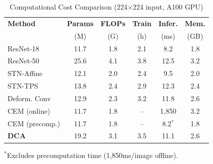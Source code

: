 \begin{table}[t]
\centering
\caption{Computational Cost Comparison (224$\times$224 input, A100 GPU)}
\label{tab:computational}
\begin{tabularx}{\textwidth}{Xccccc}
\hline
\textbf{Method} & \textbf{Params} & \textbf{FLOPs} & \textbf{Train} & \textbf{Infer.} & \textbf{Mem.} \\
 & (M) & (G) & (h) & (ms) & (GB) \\
\hline
ResNet-18 & 11.7 & 1.8 & 2.1 & 8.2 & 1.8 \\
ResNet-50 & 25.6 & 4.1 & 3.8 & 12.5 & 3.2 \\
STN-Affine & 12.1 & 2.0 & 2.4 & 9.5 & 2.0 \\
STN-TPS & 13.8 & 2.4 & 2.9 & 12.3 & 2.4 \\
Deform. Conv & 12.9 & 2.3 & 3.2 & 11.8 & 2.6 \\
CEM (online) & 11.7 & 1.8 & -- & 1,850 & 3.2 \\
CEM (precomp.) & 11.7 & 1.8 & -- & 8.2$^*$ & 1.8 \\
\textbf{DCA} & 19.2 & 3.1 & 3.5 & 11.1 & 2.6 \\
\hline
\end{tabularx}

\vspace{1mm}
\footnotesize{$^*$Excludes precomputation time (1,850ms/image offline).}
\end{table}